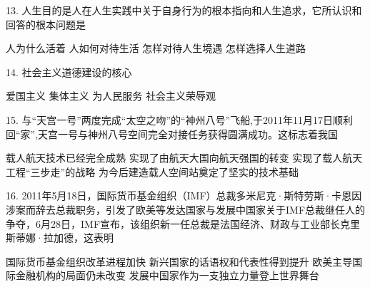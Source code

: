 13. 人生目的是人在人生实践中关于自身行为的根本指向和人生追求，它所认识和回答的根本问题是
\begin{choices}
	 人为什么活着
	 人如何对待生活
	 怎样对待人生境遇
	 怎样选择人生道路
\end{choices}

14. 社会主义道德建设的核心
\begin{choices}
	 爱国主义
	 集体主义
	 为人民服务
	 社会主义荣辱观
\end{choices}

15. 与“天宫一号”两度完成“太空之吻”的“神州八号”飞船,于2011年11月17日顺利回“家”,天宫一号与神州八号空间完全对接任务获得圆满成功。这标志着我国
\begin{choices}
	 载人航天技术已经完全成熟
	 实现了由航天大国向航天强国的转变
	 实现了载人航天工程“三步走”的战略
	 为今后建造载人空间站奠定了坚实的技术基础
\end{choices}

16. 2011年5月18日，国际货币基金组织（IMF）总裁多米尼克·斯特劳斯·卡恩因涉案而辞去总裁职务，引发了欧美等发达国家与发展中国家关于IMF总裁继任人的争夺，6月28日，IMF宣布，该组织新一任总裁是法国经济、财政与工业部长克里斯蒂娜·拉加德，这表明
\begin{choices}
	 国际货币基金组织改革进程加快
	 新兴国家的话语权和代表性得到提升
	 欧美主导国际金融机构的局面仍未改变
	 发展中国家作为一支独立力量登上世界舞台
\end{choices}

